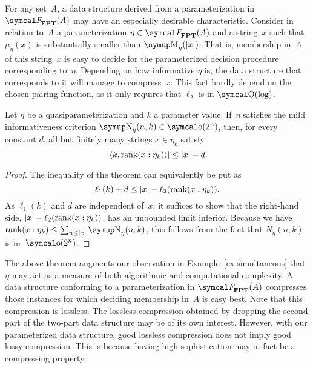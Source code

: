 For any set~$A$, a data structure derived from a parameterization in~$\calF_\cl{FPT}(A)$ may have an especially desirable characteristic.
Consider in relation to~$A$ a parameterization $\eta \in \calF_\cl{FPT}(A)$ and a string~$x$ such that $\mu_\eta(x)$ is substantially smaller than $\upM_\eta(\length{x})$.
That is, membership in~$A$ of this string~$x$ is easy to decide for the parameterized decision procedure corresponding to~$\eta$.
Depending on how informative $\eta$ is, the data structure that corresponds to it will manage to compress~$x$.
This fact hardly depend on the chosen pairing function, as it only requires that $\ell_2$ is in $\bigO(\log)$.
\begin{theorem}
\label{thm:easycompressible}%
  Let $\eta$ be a quasiparameterization and $k$ a parameter value.
  If~$\eta$ satisfies the mild informativeness criterion $\upN_\eta(n, k) \in \littleo(2^n)$, then, for every constant $d$, all but finitely many strings $x \in \eta_k$ satisfy
  \begin{equation*}
    {\lvert{\langle k, \operatorname{rank}(x : \eta_k)\rangle}\rvert} \le {\lvert x\rvert} - d.
  \end{equation*}
\end{theorem}
\begin{proof}
  The inequality of the theorem can equivalently be put as
  \begin{equation*}
    \ell_1(k) + d \le {\lvert x\rvert} - \ell_2(\operatorname{rank}(x : \eta_k)).
  \end{equation*}
  As $\ell_1(k)$ and $d$ are independent of~$x$, it suffices to show that the right-hand side, ${\lvert x\rvert} - \ell_2(\operatorname{rank}(x : \eta_k))$, has an unbounded limit inferior.
  Because we have $\rank(x : \eta_k) \le \sum_{n \le \length{x}} \upN_\eta(n, k)$, this follows from the fact that $N_\eta(n, k)$ is in~$\littleo(2^n)$.
\end{proof}

The above theorem augments our observation in Example~\ref{ex:simultaneous} that $\eta$ may act as a measure of both algorithmic and computational complexity.
A data structure conforming to a parameterization in $\calF_\cl{FPT}(A)$ compresses those instances for which deciding membership in~$A$ is easy best.
Note that this compression is lossless.
The lossless compression obtained by dropping the second part of the two-part data structure may be of its own interest.
However, with our parameterized data structure, good lossless compression does not imply good lossy compression.
This is because having high sophistication may in fact be a compressing property.

